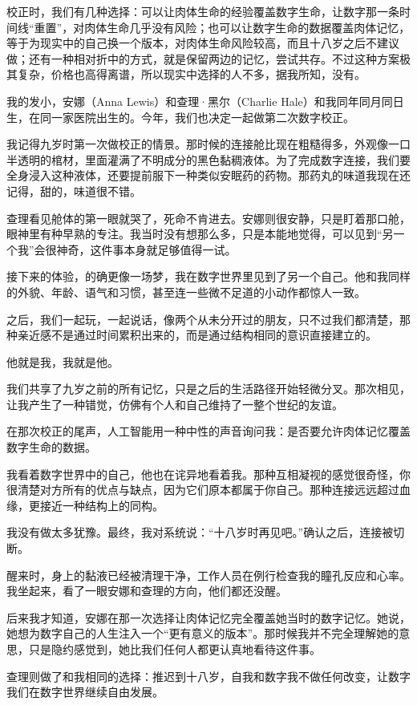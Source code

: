 校正时，我们有几种选择：可以让肉体生命的经验覆盖数字生命，让数字那一条时间线“重置”，对肉体生命几乎没有风险；也可以让数字生命的数据覆盖肉体记忆，等于为现实中的自己换一个版本，对肉体生命风险较高，而且十八岁之后不建议做；还有一种相对折中的方式，就是保留两边的记忆，尝试共存。不过这种方案极其复杂，价格也高得离谱，所以现实中选择的人不多，据我所知，没有。

我的发小，安娜（Anna Lewis）和查理·黑尔（Charlie Hale）和我同年同月同日生，在同一家医院出生的。今年，我们也决定一起做第二次数字校正。

我记得九岁时第一次做校正的情景。那时候的连接舱比现在粗糙得多，外观像一口半透明的棺材，里面灌满了不明成分的黑色黏稠液体。为了完成数字连接，我们要全身浸入这种液体，还要提前服下一种类似安眠药的药物。那药丸的味道我现在还记得，甜的，味道很不错。

查理看见舱体的第一眼就哭了，死命不肯进去。安娜则很安静，只是盯着那口舱，眼神里有种早熟的专注。我当时没有想那么多，只是本能地觉得，可以见到“另一个我”会很神奇，这件事本身就足够值得一试。

接下来的体验，的确更像一场梦，我在数字世界里见到了另一个自己。他和我同样的外貌、年龄、语气和习惯，甚至连一些微不足道的小动作都惊人一致。

之后，我们一起玩，一起说话，像两个从未分开过的朋友，只不过我们都清楚，那种亲近感不是通过时间累积出来的，而是通过结构相同的意识直接建立的。

他就是我，我就是他。

我们共享了九岁之前的所有记忆，只是之后的生活路径开始轻微分叉。那次相见，让我产生了一种错觉，仿佛有个人和自己维持了一整个世纪的友谊。

在那次校正的尾声，人工智能用一种中性的声音询问我：是否要允许肉体记忆覆盖数字生命的数据。

我看着数字世界中的自己，他也在诧异地看着我。那种互相凝视的感觉很奇怪，你很清楚对方所有的优点与缺点，因为它们原本都属于你自己。那种连接远远超过血缘，更接近一种结构上的同构。

我没有做太多犹豫。最终，我对系统说：“十八岁时再见吧。”确认之后，连接被切断。

醒来时，身上的黏液已经被清理干净，工作人员在例行检查我的瞳孔反应和心率。我坐起来，看了一眼安娜和查理的方向，他们都还没醒。

后来我才知道，安娜在那一次选择让肉体记忆完全覆盖她当时的数字记忆。她说，她想为数字自己的人生注入一个“更有意义的版本”。那时候我并不完全理解她的意思，只是隐约感觉到，她比我们任何人都更认真地看待这件事。

查理则做了和我相同的选择：推迟到十八岁，自我和数字我不做任何改变，让数字我们在数字世界继续自由发展。

